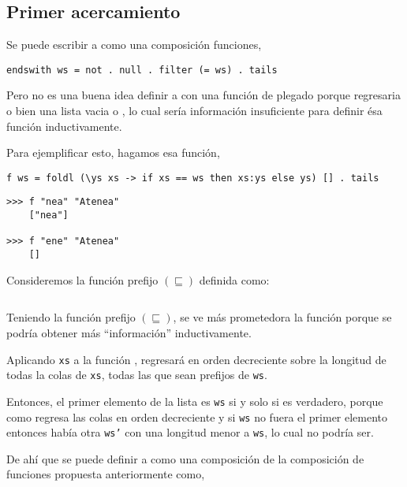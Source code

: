 
\subsection{Primer acercamiento}

Se puede escribir a  como una composición funciones,
\begin{verbatim}
endswith ws = not . null . filter (= ws) . tails
\end{verbatim}

Pero no es una buena idea definir a  con una función de plegado
 porque regresaria o bien una lista vacia o \hsCode{[ws]}, lo cual sería información
insuficiente para definir ésa función inductivamente.

Para ejemplificar esto, hagamos esa función,
\begin{verbatim}
f ws = foldl (\ys xs -> if xs == ws then xs:ys else ys) [] . tails
\end{verbatim}

\begin{verbatim}
>>> f "nea" "Atenea"
    ["nea"]

>>> f "ene" "Atenea"
    []
\end{verbatim}

Consideremos la función prefijo $(\sqsubseteq)$ definida como:

\inputminted{haskell}{definiciones/prefix.hs}

Teniendo la función prefijo $(\sqsubseteq)$, se ve más prometedora la función
 porque se podría obtener más ``información'' inductivamente.

Aplicando \texttt{xs} a la función , regresará en orden decreciente
sobre la longitud de todas la colas de \texttt{xs}, todas las que sean prefijos de \texttt{ws}.


Entonces, el primer elemento de la lista es \texttt{ws} si y solo si  es
verdadero, porque como  regresa las colas en orden decreciente y si \texttt{ws} no 
fuera el primer elemento entonces había otra \texttt{ws'} con una longitud menor a \texttt{ws}, lo
cual no podría ser.

De ahí que se puede definir a  como una composición de la composición de funciones
 propuesta anteriormente como,

